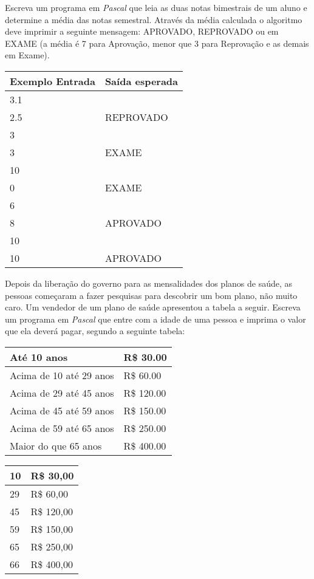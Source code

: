 \item Escreva um programa em \emph{Pascal} que leia as duas notas bimestrais 
de um aluno e determine a média das notas semestral. Através da média 
calculada o algoritmo deve imprimir a seguinte mensagem: APROVADO, 
REPROVADO ou em EXAME (a média é 7 para Aprovação, menor que 3 para 
Reprovação e as demais em Exame).

\begin{center}
\begin{tabular}{|l|l|} \hline
Exemplo Entrada & Saída esperada \\ \hline
3.1 & \\
2.5 & REPROVADO \\ \hline
3 & \\
3 & EXAME \\ \hline
10 & \\
0 & EXAME \\ \hline
6 & \\
8 & APROVADO \\ \hline
10 & \\
10 & APROVADO \\ \hline
\end{tabular}
\end{center}

\item Depois da liberação do governo para as mensalidades dos planos de saúde, as pessoas começaram a fazer pesquisas para descobrir um bom plano, não muito caro. Um vendedor de um plano de saúde apresentou a tabela a seguir. Escreva um programa em \emph{Pascal} que entre com a idade de uma pessoa e imprima o valor que ela deverá pagar, segundo a seguinte tabela:

\begin{tabular}{|l|l|}
Até 10 anos & R\$ 30.00 \\ \hline
Acima de 10 até 29 anos & R\$ 60.00 \\ \hline
Acima de 29 até 45 anos & R\$ 120.00 \\ \hline
Acima de 45 até 59 anos & R\$ 150.00 \\ \hline
Acima de 59 até 65 anos & R\$ 250.00 \\ \hline
Maior do que 65 anos & R\$ 400.00 \\ \hline
\end{tabular}

\begin{center}
\begin{tabular}{|l|l|} \hline
10 & R\$ 30,00 \\ \hline
29 & R\$ 60,00 \\ \hline
45 & R\$ 120,00 \\ \hline
59 & R\$ 150,00 \\ \hline
65 & R\$ 250,00 \\ \hline
66 & R\$ 400,00 \\ \hline
\end{tabular}
\end{center}

